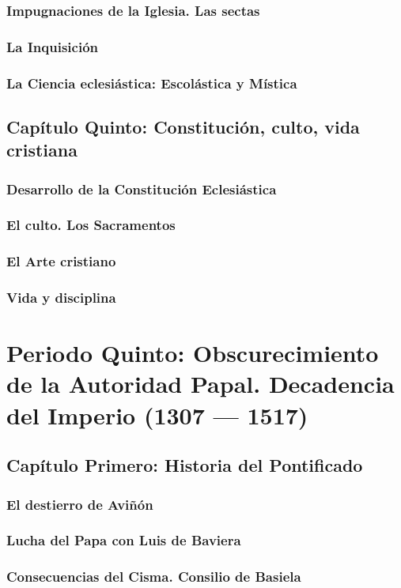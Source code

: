 \raggedbottom{} \documentclass[12pt, a4paper]{book}
\begin{document}
\section{Impugnaciones de la Iglesia. Las sectas}
\section{La Inquisición}
\section{La Ciencia eclesiástica: Escolástica y Mística}
\chapter{Capítulo Quinto: Constitución, culto, vida cristiana}
\section{Desarrollo de la Constitución Eclesiástica}
\section{El culto. Los Sacramentos}
\section{El Arte cristiano}
\section{Vida y disciplina}
\part{Periodo Quinto: Obscurecimiento de la Autoridad Papal. Decadencia del Imperio (1307 --- 1517)}
\chapter{Capítulo Primero: Historia del Pontificado}
\section{El destierro de Aviñón}
\section{Lucha del Papa con Luis de Baviera}
\section{Consecuencias del Cisma. Consilio de Basiela}
\end{document}
